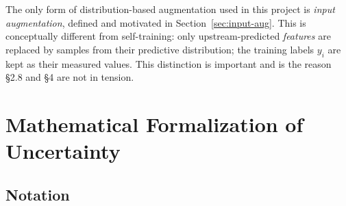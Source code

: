 \documentclass[11pt,a4paper]{article}
\begin{document}
\begin{cautionbox}
The only form of distribution-based augmentation used in this project is \emph{input augmentation}, defined and motivated in Section~\ref{sec:input-aug}. This is conceptually different from self-training: only upstream-predicted \emph{features} are replaced by samples from their predictive distribution; the training labels $y_i$ are kept as their measured values. This distinction is important and is the reason §2.8 and §4 are not in tension.
\end{cautionbox}


\section{Mathematical Formalization of Uncertainty}
\label{sec:math}

\subsection{Notation}
\end{document}
